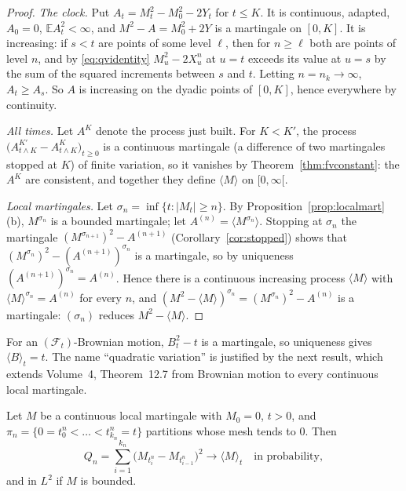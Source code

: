 \begin{proof}
\emph{The clock.} Put $A_t=M_t^2-M_0^2-2Y_t$ for $t\le K$. It is continuous, adapted, $A_0=0$, $\mathbb EA_t^2<\infty$, and $M^2-A=M_0^2+2Y$ is a martingale on $[0,K]$. It is increasing: if $s<t$ are points of some
level $\ell$, then for $n\ge\ell$ both are points of level $n$, and by \eqref{eq:qvidentity} $M^2_u-2X^n_u$ at $u=t$ exceeds its value at $u=s$ by the sum of the squared increments between $s$ and $t$. Letting
$n=n_k\to\infty$, $A_t\ge A_s$. So $A$ is increasing on the dyadic points of $[0,K]$, hence everywhere by continuity.

\emph{All times.} Let $A^K$ denote the process just built. For $K<K'$, the process $\bigl(A^{K'}_{t\wedge K}-A^K_{t\wedge K}\bigr)_{t\ge0}$ is a continuous martingale (a difference of two martingales stopped at $K$) of finite
variation, so it vanishes by Theorem~\ref{thm:fvconstant}: the $A^K$ are consistent, and together they define $\langle M\rangle$ on $[0,\infty[$.

\emph{Local martingales.} Let $\sigma_n=\inf\{t:|M_t|\ge n\}$. By Proposition~\ref{prop:localmart}(b), $M^{\sigma_n}$ is a bounded martingale; let $A^{(n)}=\langle M^{\sigma_n}\rangle$. Stopping at $\sigma_n$ the martingale
$(M^{\sigma_{n+1}})^2-A^{(n+1)}$ (Corollary~\ref{cor:stopped}) shows that $(M^{\sigma_n})^2-(A^{(n+1)})^{\sigma_n}$ is a martingale, so by uniqueness $(A^{(n+1)})^{\sigma_n}=A^{(n)}$. Hence there is a continuous increasing
process $\langle M\rangle$ with $\langle M\rangle^{\sigma_n}=A^{(n)}$ for every $n$, and $(M^2-\langle M\rangle)^{\sigma_n}=(M^{\sigma_n})^2-A^{(n)}$ is a martingale: $(\sigma_n)$ reduces $M^2-\langle M\rangle$.
\end{proof}

For an $(\mathcal F_t)$-Brownian motion, $B^2_t-t$ is a martingale, so uniqueness gives $\langle B\rangle_t=t$. The name ``quadratic variation'' is justified by the next result, which extends Volume~4, Theorem~12.7
from Brownian motion to every continuous local martingale.

\begin{proposition}\label{prop:qvsums}
Let $M$ be a continuous local martingale with $M_0=0$, $t>0$, and $\pi_n=\{0=t^n_0<\dots<t^n_{k_n}=t\}$ partitions whose mesh tends to $0$. Then
\[
Q_n=\sum_{i=1}^{k_n}\bigl(M_{t^n_i}-M_{t^n_{i-1}}\bigr)^2\longrightarrow\langle M\rangle_t\quad\text{in probability},
\]
and in $L^2$ if $M$ is bounded.
\end{proposition}

